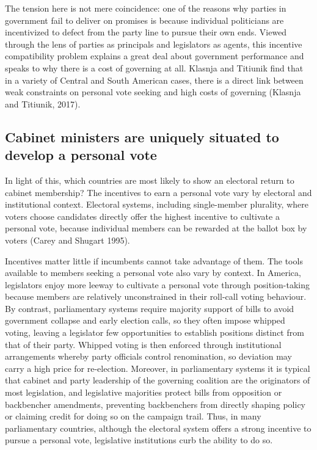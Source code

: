 \documentclass[letter,12pt]{article}
\begin{document}
The tension here is not mere coincidence: one of the reasons why parties in government fail to deliver on promises is because individual politicians are incentivized to defect from the party line to pursue their own ends. Viewed through the lens of parties as principals and legislators as agents, this incentive compatibility problem explains a great deal about government performance and speaks to why there is a cost of governing at all. Klasnja and Titiunik find that in a variety of Central and South American cases, there is a direct link between weak constraints on personal vote seeking and high costs of governing (Klasnja and Titiunik, 2017).

\subsection*{Cabinet ministers are uniquely situated to develop a personal vote}

In light of this, which countries are most likely to show an electoral return to cabinet membership? The incentives to earn a personal vote vary by electoral and institutional context. Electoral systems, including single-member plurality, where voters choose candidates directly offer the highest incentive to cultivate a personal vote, because individual members can be rewarded at the ballot box by voters (Carey and Shugart 1995).

Incentives matter little if incumbents cannot take advantage of them. The tools available to members seeking a personal vote also vary by context. In America, legislators enjoy more leeway to cultivate a personal vote through position-taking because members are relatively unconstrained in their roll-call voting behaviour.  By contrast, parliamentary systems require majority support of bills to avoid government collapse and early election calls, so they often impose whipped voting, leaving a legislator few opportunities to establish positions distinct from that of their party. Whipped voting is then enforced through institutional arrangements whereby party officials control renomination, so deviation may carry a high price for re-election. Moreover, in parliamentary systems it is typical that cabinet and party leadership of the governing coalition are the originators of most legislation, and legislative majorities protect bills from opposition or backbencher amendments, preventing backbenchers from directly shaping policy or claiming credit for doing so on the campaign trail. Thus, in many parliamentary countries, although the electoral system offers a strong incentive to pursue a personal vote, legislative institutions curb the ability to do so.
\end{document}
